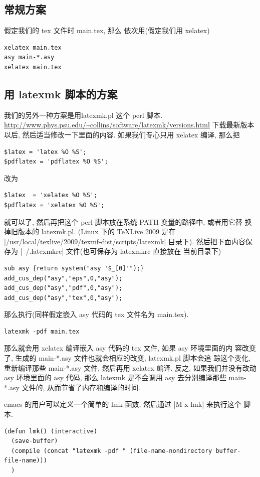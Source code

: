\documentclass[nofonts,CJKnormalspaces]{ctexbook}[2009/05/20]
\begin{document}
\subsection{常规方案}
假定我们的 tex 文件时 main.tex, 那么
依次用(假定我们用 xelatex)
\begin{verbatim}
xelatex main.tex
asy main-*.asy
xelatex main.tex
\end{verbatim}

\subsection{用 latexmk 脚本的方案}
我们的另外一种方案是用latexmk.pl 这个 perl 脚本.
\url{http://www.phys.psu.edu/~collins/software/latexmk/versions.html}
下载最新版本以后,
然后适当修改一下里面的内容. 如果我们专心只用 xelatex 编译, 那么把
\begin{verbatim}
$latex = 'latex %O %S';
$pdflatex = 'pdflatex %O %S';
\end{verbatim}
改为
\begin{verbatim}
$latex  = 'xelatex %O %S';
$pdflatex = 'xelatex %O %S';
\end{verbatim}
就可以了, 然后再把这个 perl 脚本放在系统 PATH 变量的路径中, 或者用它替
换掉旧版本的 latexmk.pl. (Linux 下的 TeXLive 2009 是在
|/usr/local/texlive/2009/texmf-dist/scripts/latexmk| 目录下).
然后把下面内容保存为 |~/.latexmkrc| 文件(也可保存为 latexmkrc 直接放在
当前目录下)
\begin{verbatim}
sub asy {return system("asy '$_[0]'");}
add_cus_dep("asy","eps",0,"asy");
add_cus_dep("asy","pdf",0,"asy");
add_cus_dep("asy","tex",0,"asy");
\end{verbatim}
那么执行(同样假定嵌入 asy 代码的 tex 文件名为 main.tex).
\begin{verbatim}
latexmk -pdf main.tex
\end{verbatim}
那么就会用 xelatex 编译嵌入 asy 代码的 tex 文件, 如果 asy 环境里面的内
容改变了, 生成的 main-*.asy 文件也就会相应的改变, latexmk.pl 脚本会追
踪这个变化, 重新编译那些 main-*.asy 文件, 然后再用 xelatex 编译. 反之,
如果我们并没有改动 asy 环境里面的 asy 代码, 那么 latexmk 是不会调用
asy 去分别编译那些 main-*.asy 文件的, 从而节省了内存和编译的时间.

emacs 的用户可以定义一个简单的 lmk 函数, 然后通过 |M-x lmk| 来执行这个
脚本.
\begin{verbatim}
(defun lmk() (interactive)
  (save-buffer)
  (compile (concat "latexmk -pdf " (file-name-nondirectory buffer-file-name)))
  )
\end{verbatim}
\end{document}
